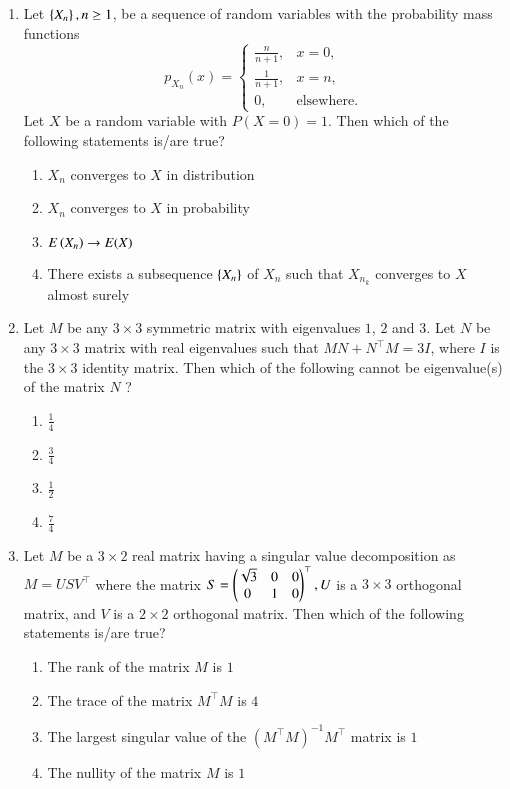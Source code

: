 \documentclass[journal]{IEEEtran}
\begin{document}
\begin{enumerate}
    \item Let $\left\{X_{n}\right\}, n\geq1$, be a sequence of random variables with the probability mass functions $$p_{X_{n}}(x)=
        \begin{cases}
            \frac{n}{n+1}, & x=0,\\
            \frac{1}{n+1}, & x = n, \\
            0, & \text{elsewhere.}
        \end{cases}$$
            Let $X$ be a random variable with $P(X = 0) = 1$. Then which of the following statements is/are true?
            \begin{enumerate}
                \item $X_{n}$ converges to $X$ in distribution
                \item $X_{n}$ converges to $X$ in probability
                \item $E\left(X_{n}\right)\to E(X)$ 
                \item There exists a subsequence $\left\{X_{n}\right\}$ of $X_{n}$ such that $X_{n_{k}}$ converges to $X$ almost surely
            \end{enumerate}

        \item Let $M$ be any $3 \times 3$ symmetric matrix with eigenvalues $1$, $2$ and $3$. Let $N$ be any $3 \times 3$ matrix with real eigenvalues such that $MN + N^\top M = 3I$, where $I$ is the $3 \times 3$ identity matrix. Then which of the following cannot be eigenvalue(s) of the matrix $N$ ?
            \begin{enumerate}
                \item $\frac{1}{4}$
                \item $\frac{3}{4}$
                \item $\frac{1}{2}$
                \item $\frac{7}{4}$
            \end{enumerate}

        \item Let $M$ be a $3 \times 2$ real matrix having a singular value decomposition as $M=USV^\top$ where the matrix $S = \begin{pmatrix}\sqrt{3} & 0 & 0 \\ 0 & 1 & 0\end{pmatrix}^\top,U$ is a $3 \times 3$ orthogonal matrix, and $V$ is a $2 \times 2$ orthogonal matrix. Then which of the following statements is/are true?
            \begin{enumerate}
                \item The rank of the matrix $M$ is $1$
                \item The trace of the matrix $M^\top M$ is $4$
                \item The largest singular value of the $(M^\top M)^{-1}M^\top$ matrix is $1$
                \item The nullity of the matrix $M$ is $1$
            \end{enumerate}


\end{enumerate}
\end{document}
